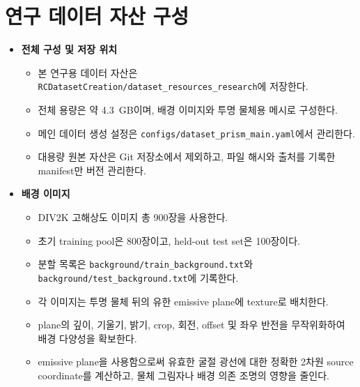 \section{연구 데이터 자산 구성}
\label{sec:research-assets}

\begin{itemize}
    \item \textbf{전체 구성 및 저장 위치}
    \begin{itemize}
        \item 본 연구용 데이터 자산은
        \texttt{RCDatasetCreation/dataset\_resources\_research}에 저장한다.
        \item 전체 용량은 약 4.3~GB이며, 배경 이미지와 투명 물체용
        메시로 구성한다.
        \item 메인 데이터 생성 설정은
        \texttt{configs/dataset\_prism\_main.yaml}에서 관리한다.
        \item 대용량 원본 자산은 Git 저장소에서 제외하고, 파일 해시와
        출처를 기록한 manifest만 버전 관리한다.
    \end{itemize}

    \item \textbf{배경 이미지}
    \begin{itemize}
        \item DIV2K 고해상도 이미지 총 900장을 사용한다.
        \item 초기 training pool은 800장이고, held-out test set은
        100장이다.
        \item 분할 목록은
        \texttt{background/train\_background.txt}와
        \texttt{background/test\_background.txt}에 기록한다.
        \item 각 이미지는 투명 물체 뒤의 유한 emissive plane에 texture로
        배치한다.
        \item plane의 깊이, 기울기, 밝기, crop, 회전, offset 및 좌우 반전을
        무작위화하여 배경 다양성을 확보한다.
        \item emissive plane을 사용함으로써 유효한 굴절 광선에 대한 정확한
        2차원 source coordinate를 계산하고, 물체 그림자나 배경 의존 조명의
        영향을 줄인다.
    \end{itemize}


\end{itemize}

